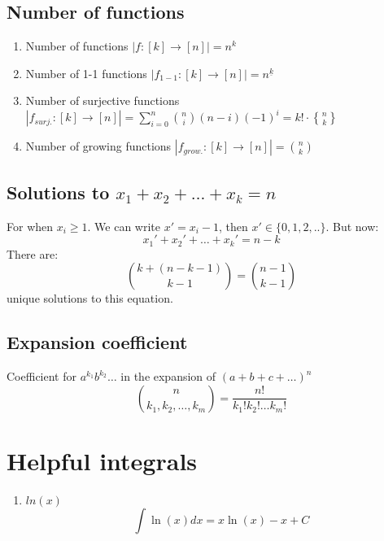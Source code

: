 \documentclass{article}
\begin{document}
\subsection{Number of functions}

\begin{enumerate}
    \item Number of functions \(|f:[k]\rightarrow[n]| = n^k\) 
    \item Number of 1-1 functions \(|f_{1-1}:[k]\rightarrow[n]| = n^{\underline{k}}\)
    \item Number of surjective functions \(|f_{surj.}:[k]\rightarrow[n]| = \sum_{i=0}^{n} \binom{n}{i} (n-i) (-1)^{i} = k! \cdot \genfrac\{\}{0pt}{1}{n}{k}\)
    \item Number of growing functions \(|f_{grow.}:[k]\rightarrow[n]| = \binom{n}{k}\)
\end{enumerate}

\subsection{Solutions to $x_1 + x_2 + \dots + x_k = n$}

For when $x_i\geq 1$. We can write $x' = x_i -1$, then $x' \in \{0,1,2,..\}$. But now:
\[
x_1' + x_2' + \dots + x_k' = n-k
\]
There are:
\[
\binom{k+(n-k-1)}{k-1} = \binom{n-1}{k-1}
\]
unique solutions to this equation.

\subsection{Expansion coefficient}

Coefficient for $a^{k_1} b^{k_2} \dots $ in the expansion of $(a+b+c+\dots)^n$
\[
\binom{n}{k_1, k_2, \dots, k_m} = \frac{n!}{k_1! k_2! \dots k_m!}
\]

\section{Helpful integrals}

\begin{enumerate}
    \item \(ln(x)\) \[\int \ln(x) dx = x\ln(x) - x + C\]
\end{enumerate}
\end{document}
